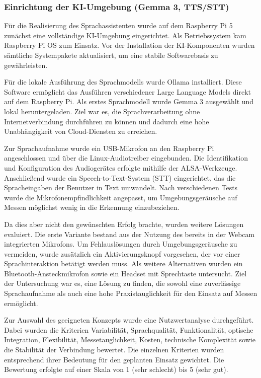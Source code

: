 \subsubsection*{Einrichtung der KI-Umgebung (Gemma 3, TTS/STT)}

Für die Realisierung des Sprachassistenten wurde auf dem Raspberry Pi 5 zunächst eine vollständige KI-Umgebung eingerichtet. Als Betriebssystem kam Raspberry Pi OS zum Einsatz. Vor der Installation der KI-Komponenten wurden sämtliche Systempakete aktualisiert, um eine stabile Softwarebasis zu gewährleisten.

Für die lokale Ausführung des Sprachmodells wurde Ollama installiert. Diese Software ermöglicht das Ausführen verschiedener Large Language Models direkt auf dem Raspberry Pi. Als erstes Sprachmodell wurde Gemma 3 ausgewählt und lokal heruntergeladen. Ziel war es, die Sprachverarbeitung ohne Internetverbindung durchführen zu können und dadurch eine hohe Unabhängigkeit von Cloud-Diensten zu erreichen.

Zur Sprachaufnahme wurde ein USB-Mikrofon an den Raspberry Pi angeschlossen und über die Linux-Audiotreiber eingebunden. Die Identifikation und Konfiguration des Audiogerätes erfolgte mithilfe der ALSA-Werkzeuge. Anschließend wurde ein Speech-to-Text-System (STT) eingerichtet, das die Spracheingaben der Benutzer in Text umwandelt. Nach verschiedenen Tests wurde die Mikrofonempfindlichkeit angepasst, um Umgebungsgeräusche auf Messen möglichst wenig in die Erkennung einzubeziehen.

Da dies aber nicht den gewünschten Erfolg brachte, wurden weitere Lösungen evaluiert. Die erste Variante bestand aus der Nutzung des bereits in der Webcam integrierten Mikrofons. Um Fehlauslösungen durch Umgebungsgeräusche zu vermeiden, wurde zusätzlich ein Aktivierungsknopf vorgesehen, der vor einer Sprachinteraktion betätigt werden muss. Als weitere Alternativen wurden ein Bluetooth-Ansteckmikrofon sowie ein Headset mit Sprechtaste untersucht. Ziel der Untersuchung war es, eine Lösung zu finden, die sowohl eine zuverlässige Sprachaufnahme als auch eine hohe Praxistauglichkeit für den Einsatz auf Messen ermöglicht.

Zur Auswahl des geeigneten Konzepts wurde eine Nutzwertanalyse durchgeführt. Dabei wurden die Kriterien Variabilität, Sprachqualität, Funktionalität, optische Integration, Flexibilität, Messetauglichkeit, Kosten, technische Komplexität sowie die Stabilität der Verbindung bewertet. Die einzelnen Kriterien wurden entsprechend ihrer Bedeutung für den geplanten Einsatz gewichtet. Die Bewertung erfolgte auf einer Skala von 1 (sehr schlecht) bis 5 (sehr gut).

